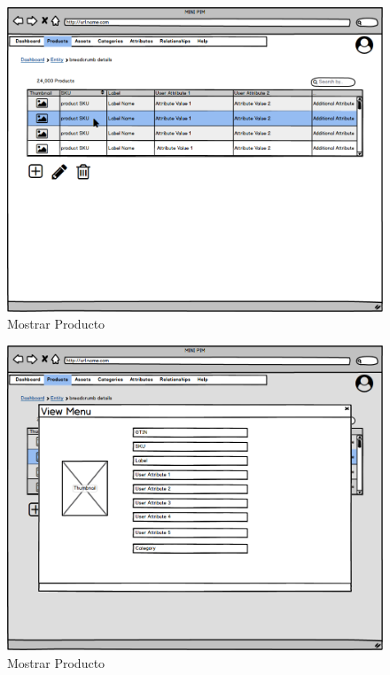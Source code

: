 \begin{figure}[H]
    \includegraphics[width=1\linewidth]{mockups/RF2.X_MostrarProducto(Desde Listado).png}
    \caption{Mostrar Producto}
   \end{figure}
\vspace{1.0cm}
\begin{figure}[H]
    \includegraphics[width=1\linewidth]{mockups/RF2.X_MostrarProducto(Menu visualizacion).png}
    \caption{Mostrar Producto}
   \end{figure}
\vspace{1.0cm}


\newpage %